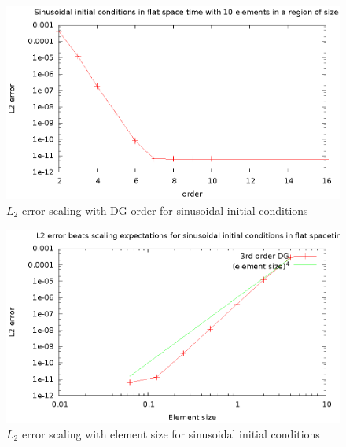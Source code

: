 \begin{figure}
  \includegraphics{sinL2WTorder}
  \caption{$L_2$ error scaling with DG order for sinusoidal initial conditions}
  \label{scalingorder}
\end{figure}

\begin{figure}
  \includegraphics{sinL2WTelement}
  \caption{$L_2$ error scaling with element size for sinusoidal initial conditions}
  \label{scalingelement}
\end{figure}


